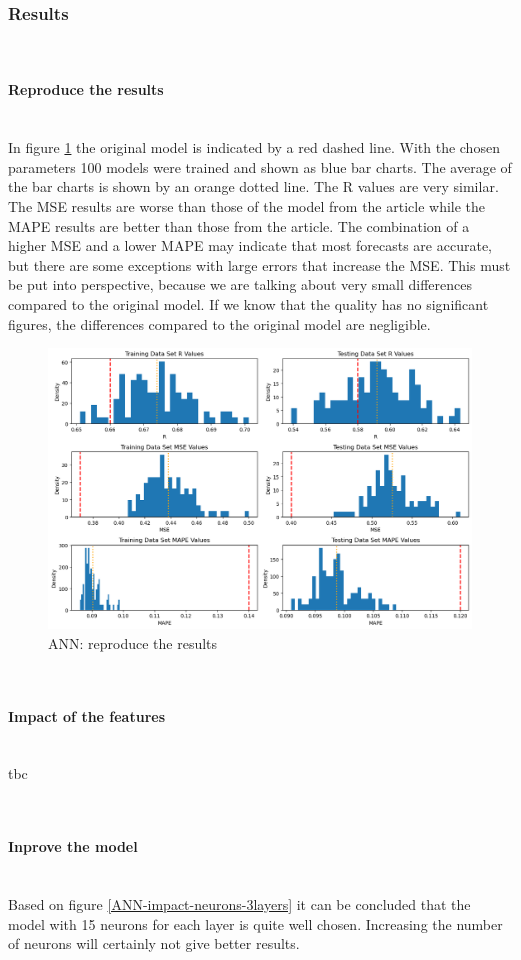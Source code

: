 \documentclass{article}
\newcommand{\subsubsubsection}[1]{%
  \paragraph{#1}\mbox{}\\}
\begin{document}
\subsubsection{Results}

\subsubsubsection{Reproduce the results}

In figure \ref{fig:ANN-reproduce-the-results} the original model is indicated by a red dashed line. With the chosen parameters 100 models were trained and shown as blue bar charts. The average of the bar charts is shown by an orange dotted line.
The R values are very similar. The MSE results are worse than those of the model from the article while the MAPE results are better than those from the article.
The combination of a higher MSE and a lower MAPE may indicate that most forecasts are accurate, but there are some exceptions with large errors that increase the MSE.
This must be put into perspective, because we are talking about very small differences compared to the original model. If we know that the quality has no significant figures, the differences compared to the original model are negligible.

\begin{figure}
	\centering
	\includegraphics[width=\linewidth]{figures/ANN_reproduce_the_results.png}
	\caption{ANN: reproduce the results}
	\label{fig:ANN-reproduce-the-results}
\end{figure}


\subsubsubsection{Impact of the features}
tbc

\subsubsubsection{Inprove the model}
Based on figure \ref{ANN-impact-neurons-3layers} it can be concluded that the model with 15 neurons for each layer is quite well chosen. Increasing the number of neurons will certainly not give better results.
\end{document}
